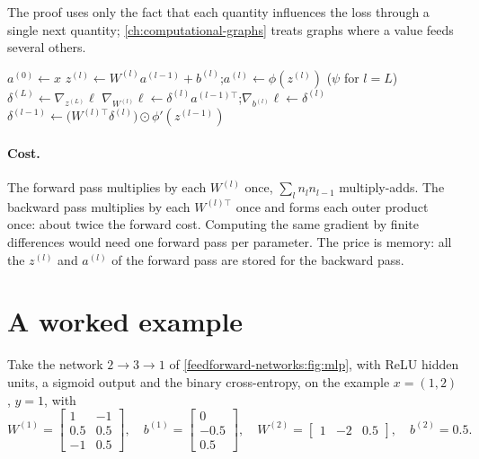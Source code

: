\begin{notechapter}
The proof uses only the fact that each quantity influences the loss through a single next
quantity; \cref{ch:computational-graphs} treats graphs where a value feeds several others.

\begin{algorithm}[ht]
\caption{Backpropagation for one example}\label{backpropagation:alg:backprop}
\begin{algorithmic}[1]
\State $a^{(0)}\gets x$
 
  \State $z^{(l)}\gets W^{(l)}a^{(l-1)} + b^{(l)}$;\quad $a^{(l)}\gets\phi(z^{(l)})$ \quad($\psi$ for $l = L$)
\EndFor
\State $\delta^{(L)}\gets\nabla_{z^{(L)}}\ell$ 
 
  \State $\nabla_{W^{(l)}}\ell\gets\delta^{(l)}a^{(l-1)\top}$;\quad $\nabla_{b^{(l)}}\ell\gets\delta^{(l)}$
   $\delta^{(l-1)}\gets\bigl(W^{(l)\top}\delta^{(l)}\bigr)\odot\phi'(z^{(l-1)})$ \EndIf
\EndFor
\end{algorithmic}
\end{algorithm}

\paragraph{Cost.} The forward pass multiplies by each $W^{(l)}$ once, $\sum_ln_ln_{l-1}$ multiply-adds. The backward
pass multiplies by each $W^{(l)\top}$ once and forms each outer product once: about twice the
forward cost. Computing the same gradient by finite differences would need one forward
pass per parameter. The price is memory: all the $z^{(l)}$ and $a^{(l)}$ of the forward pass are
stored for the backward pass.

\section{A worked example}\label{backpropagation:sec:example}

Take the network $2\to3\to1$ of \cref{feedforward-networks:fig:mlp}, with ReLU hidden units, a sigmoid
output and the binary cross-entropy, on the example $x = (1,2)$, $y = 1$, with
\[
  W^{(1)} = \begin{bmatrix} 1 & -1\\ 0.5 & 0.5\\ -1 & 0.5\end{bmatrix},\quad
  b^{(1)} = \begin{bmatrix} 0\\ -0.5\\ 0.5\end{bmatrix},\quad
  W^{(2)} = \begin{bmatrix} 1 & -2 & 0.5\end{bmatrix},\quad b^{(2)} = 0.5 .
\]


\end{notechapter}
